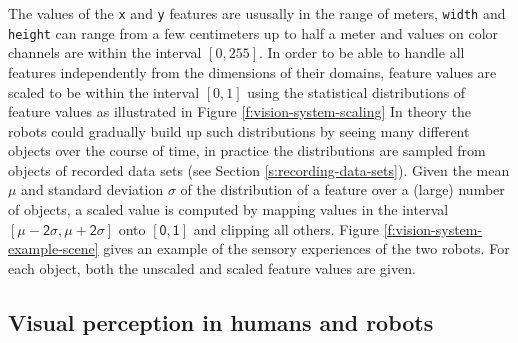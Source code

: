 The values of the {\tt x} and {\tt y} features are ususally in the
range of meters, {\tt width} and {\tt height} can range from a few
centimeters up to half a meter and values on color channels are within
the interval $[0,255]$. In order to be able to handle all features
independently from the dimensions of their domains, feature values are
scaled to be within the interval $[0,1]$ using the statistical
distributions of feature values as illustrated in Figure
\ref{f:vision-system-scaling} In theory the robots could gradually
build up such distributions by seeing many different objects over the
course of time, in practice the distributions are sampled from objects
of recorded data sets (see Section \ref{s:recording-data-sets}). Given
the mean $\mu$ and standard deviation $\sigma$ of the distribution of
a feature over a (large) number of objects, a scaled value is computed
by mapping values in the interval $\mathsf{[\mu-2\sigma,\mu+2\sigma]}$
onto $\mathsf{[0,1]}$ and clipping all others. Figure
\ref{f:vision-system-example-scene} gives an example of the sensory
experiences of the two robots. For each object, both the unscaled and
scaled feature values are given.


\subsection{Visual perception in humans and robots}

